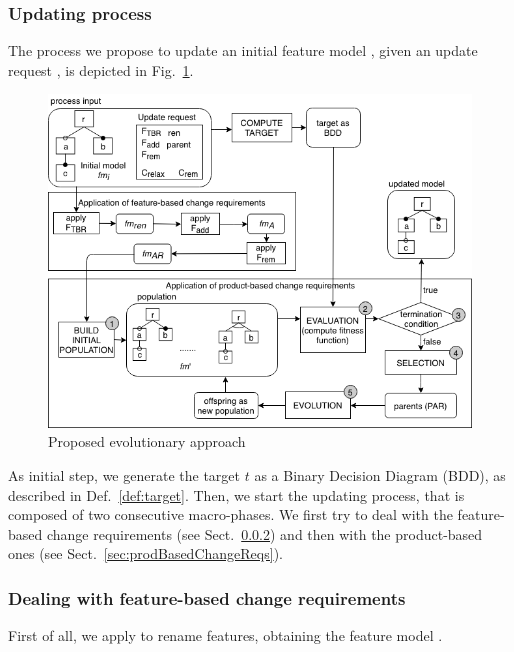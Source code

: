 \begin{tikzborder}{\cite{Gargantini16:validation}}
\begin{tikzborder}{\cite{gargantini_combinatorial_2017}}
\begin{tikzborder}{\cite{garn2019}}
\begin{tikzborder}{\cite{arcaini2019achieving}}
	\subsubsection{Updating process}\label{sec:updatingProcess}
	
	\bb
	The process we propose to update an initial feature model \initFm, given an update request \UR, is depicted in Fig.~\ref{fig:approach}.
	\be
	
	\begin{figure}[h]
		\centering
		\includegraphics[width=\textwidth]{evolutionaryApproach}
		\caption{Proposed evolutionary approach}
		\label{fig:approach}
	\end{figure}
	
	\bb
	As initial step, we generate the target $t$ as a Binary Decision Diagram (BDD), as described in Def.~\ref{def:target}. Then, we start the updating process, that is composed of two consecutive macro-phases. We first try to deal with the feature-based change requirements (see Sect.~\ref{sec:featBasedChangeReqs}) and then with the product-based ones (see Sect.~\ref{sec:prodBasedChangeReqs}).
	\be
	
	\subsubsection{Dealing with feature-based change requirements}\label{sec:featBasedChangeReqs}
	
	\bb 
	First of all, we apply \Ftbr to rename features, obtaining the feature model \fmrenamed.
	

\end{tikzborder}
\end{tikzborder}
\end{tikzborder}
\end{tikzborder}
